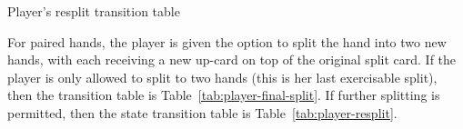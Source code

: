 \begin{table}[ht!]
\caption{Player's resplit transition table}
\begin{center}

\end{center}
\label{tab:player-resplit}
\end{table}

For paired hands, the player is given the option to split the
hand into two new hands, with each receiving a new up-card on top
of the original split card.
If the player is only allowed to split to two hands
(this is her last exercisable split), 
then the transition table is Table~\ref{tab:player-final-split}.
If further splitting is permitted, then the state transition table
is Table~\ref{tab:player-resplit}.

